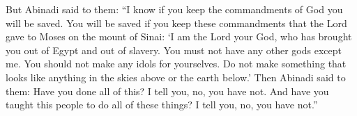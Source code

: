But Abinadi said to them: ``I know if you keep the commandments of God you will be saved. You will be saved if you keep these commandments that the Lord gave to Moses on the mount of Sinai:
\bverse \iffalse I am the Lord thy God, who hath brought thee out of the land of Egypt, out of the house of bondage. \fi
\lq I am the Lord your God, who has brought you out of Egypt and out of slavery.
\bverse \iffalse Thou shalt have no other God before me. \fi
You must not have any other gods except me.
\bverse \iffalse Thou shalt not make unto thee any graven image, or any likeness of any thing in heaven above, or things which are in the earth beneath. \fi
You should not make any idols for yourselves. Do not make something that looks like anything in the skies above or the earth below.\rq
\bverse \iffalse Now Abinadi said unto them, Have ye done all this? I say unto you, Nay, ye have not. And have ye taught this people that they should do all these things? I say unto you, Nay, ye have not. \fi
Then Abinadi said to them: Have you done all of this? I tell you, no, you have not. And have you taught this people to do all of these things? I tell you, no, you have not.''

